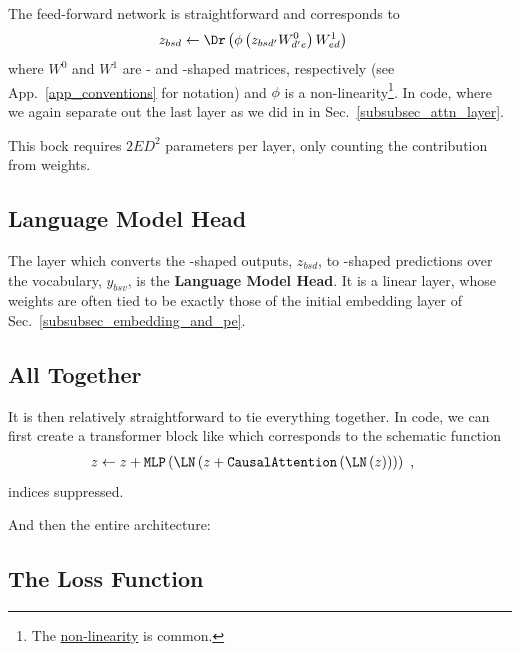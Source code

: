 The feed-forward network is straightforward and corresponds to
\begin{align}
	z _{ bsd } & \leftarrow \Dr \left (\phi \left ( z _{ bsd' }W ^{ 0 }_{ d'e } \right ) W ^{ 1 } _{ ed
	} \right ) \label{eq_mlp}
\end{align}
where $ W ^{ 0 } $ and $ W ^{ 1 } $ are - and -shaped matrices,
respectively (see App.~\ref{app_conventions} for notation) and $ \phi $ is a
non-linearity\footnote{The 
	\href{https://pytorch.org/docs/stable/generated/torch.nn.GELU.html}{non-linearity} is common.}.
In code, where we again separate out the last  layer as we did in in
Sec.~\ref{subsubsec_attn_layer}.  

This bock requires $ 2 E D ^{ 2 } $ parameters per layer, only counting the contribution from
weights.


\subsection{Language Model Head \label{subsubsec_language_model_head} }


The layer which converts the -shaped outputs, $ z _{ bsd } $, to -shaped
predictions over the vocabulary, $  y _{ bsv } $, is the \textbf{Language Model Head}. It
is a linear layer, whose weights are often tied to be exactly those of the initial embedding
layer of Sec.~\ref{subsubsec_embedding_and_pe}.


\subsection{All Together}
It is then relatively straightforward to tie everything together.  In code, we can first create a
transformer block like
which corresponds to the schematic function
\begin{align}
	z & \leftarrow  z + \texttt{MLP}\left ( \LN \left ( z + \texttt{CausalAttention}\left ( \LN \left (
				z\right ) \right )  \right ) \right )\ ,
\end{align}
indices suppressed.

And then the entire architecture: 


\subsection{The Loss Function}

